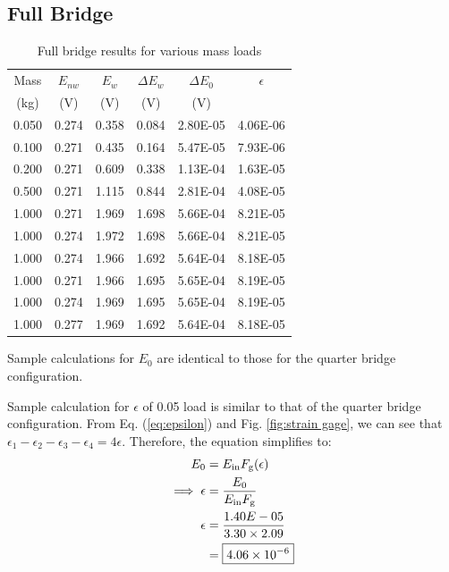 \subsection{Full Bridge}

\begin{table}[h]
    \centering
    \caption{Full bridge results for various mass loads}
    \label{tab:Q1FullBridge}
    \begin{tabular}{cccccc}
        \toprule
        Mass & $E_{nw}$ & $E_w$ & $\Delta E_w$ & $\Delta E_0$ & $\epsilon$ \\
        (kg) & (V) & (V) & (V) & (V) & \\
        \midrule
        0.050 & 0.274 & 0.358 & 0.084 & 2.80E-05 & 4.06E-06 \\
        0.100 & 0.271 & 0.435 & 0.164 & 5.47E-05 & 7.93E-06 \\
        0.200 & 0.271 & 0.609 & 0.338 & 1.13E-04 & 1.63E-05 \\
        0.500 & 0.271 & 1.115 & 0.844 & 2.81E-04 & 4.08E-05 \\
        1.000 & 0.271 & 1.969 & 1.698 & 5.66E-04 & 8.21E-05 \\
        1.000 & 0.274 & 1.972 & 1.698 & 5.66E-04 & 8.21E-05 \\
        1.000 & 0.274 & 1.966 & 1.692 & 5.64E-04 & 8.18E-05 \\
        1.000 & 0.271 & 1.966 & 1.695 & 5.65E-04 & 8.19E-05 \\
        1.000 & 0.274 & 1.969 & 1.695 & 5.65E-04 & 8.19E-05 \\
        1.000 & 0.277 & 1.969 & 1.692 & 5.64E-04 & 8.18E-05 \\
        \bottomrule
    \end{tabular}
\end{table}

Sample calculations for $E_0$ are identical to those for the quarter bridge configuration.

Sample calculation for $\epsilon$ of 0.05 load is similar to that of the quarter bridge configuration. From Eq. (\ref{eq:epsilon}) and
Fig. \ref{fig:strain gage}, we can see that $\epsilon_1 - \epsilon_2  - \epsilon_3 - \epsilon_4 = 4 \epsilon$. Therefore, the equation simplifies to:
\begin{align*}
    E_0 &= E_{\text{in}} F_{\text{g}}
    (\epsilon) \\
    \implies \epsilon &= \frac{E_0}{E_{\text{in}} F_{\text{g}}} \\
    \epsilon &= \frac{1.40E-05}{3.30 \times 2.09} \\
     &= \boxed{\qty{4.06E-06}{}}
\end{align*}